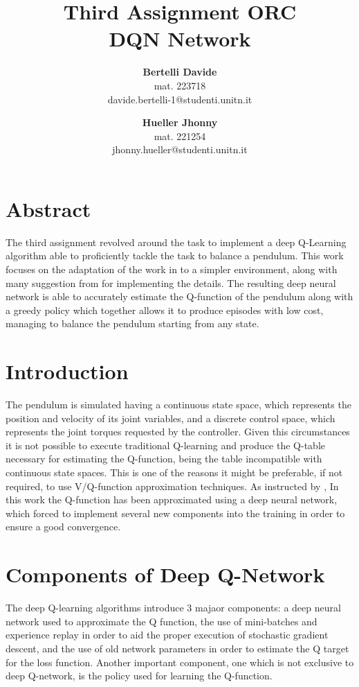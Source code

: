 \documentclass[twocolumn, a4paper]{article}
\begin{document}
\setlength{\textfloatsep}{0.3cm}
\setlength{\floatsep}{0.3cm}
\title{
	   \LARGE\textbf{Third Assignment ORC\\DQN Network}
	   \vspace{1cm}
	  }
\author{
		\textbf{Bertelli Davide} \\
		mat. 223718 \\
		davide.bertelli-1@studenti.unitn.it
		\and
		\textbf{Hueller Jhonny} \\
		mat. 221254\\
		jhonny.hueller@studenti.unitn.it
	   }
\date{}
\maketitle

\section{Abstract}
The third assignment revolved around the task to implement a deep Q-Learning
algorithm able to proficiently tackle the task to balance a pendulum.
This work focuses on the adaptation of the work in \cite{Mnih} to a simpler
environment, along with many suggestion from \cite{Roderick} for
implementing the details.
The resulting deep neural network is able to accurately estimate the Q-function
of the pendulum along with a greedy policy which together allows it to produce 
episodes with low cost, managing to balance the pendulum starting from any state.

\section{Introduction}
The pendulum is simulated having a continuous state space, which represents
the position and velocity of its joint variables, and a discrete control
space, which represents the joint torques requested by the controller.
Given this circumstances it is not possible to execute traditional Q-learning
and produce the Q-table necessary for estimating the Q-function, being the table
incompatible with continuous state spaces.
This is one of the reasons it might be preferable, if not required, to use
V/Q-function approximation techniques.
As instructed by \cite{Roderick}, In this work the Q-function has been
approximated using a deep neural network, which forced to implement several
new components into the training in order to ensure a good convergence.

\section{Components of Deep Q-Network}
The deep Q-learning algorithms introduce 3 majaor components: a deep neural
network used to approximate the Q function, the use of mini-batches and
experience replay in order to aid the proper execution of stochastic gradient
descent, and the use of old network parameters in order to estimate the Q
target for the loss function\cite{Roderick}. Another important component,
one which is not exclusive to deep Q-network, is the policy used for learning
the Q-function.
\end{document}
